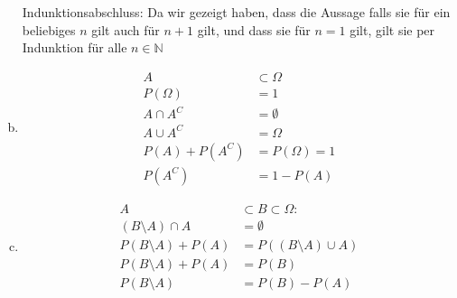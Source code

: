 \documentclass[parskip=half,a4paper]{scrartcl}
\begin{document}
\begin{enumerate}[(a)]
Indunktionsabschluss: Da wir gezeigt haben, dass die Aussage falls sie für ein beliebiges $n$ gilt auch für $n+1$ gilt, und dass sie für $n=1$ gilt, gilt sie per Indunktion für alle $n \in \mathbb{N}$


\item
\begin{align}
    A &\subset \Omega\\
    P(\Omega) &= 1\\
    A \cap A^C &= \emptyset\\
    A \cup A^C & = \Omega\\
    P(A) + P(A^C) &= P(\Omega) = 1\\
    P(A^C) &= 1 - P(A)
\end{align}




\item

\begin{align}
    A &\subset B \subset \Omega:\\
    (B \setminus A) \cap A &= \emptyset\\
    P(B\setminus A) + P(A) &= P((B\setminus A) \cup A)\\
    P(B\setminus A) + P(A) &= P(B)\\
    P(B\setminus A) &= P(B) - P(A)
\end{align}
\end{enumerate}
\end{document}
